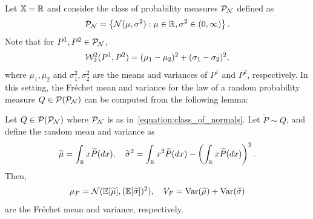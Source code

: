 Let $\mathbb{X} = \mathbb{R}$ and consider the class of probability measures $\mathcal{P}_{\mathcal{N}}$ defined as
\begin{equation}\label{equation:class_of_normals}
\mathcal{P}_{\mathcal{N}} = \left\{\mathcal{N}(\mu, \sigma^2) : \mu \in \mathbb{R}, \sigma^2 \in (0,\infty) \right\}.
\end{equation}
Note that for $P^1, P^2 \in \mathcal{P}_{\mathcal{N}}$,
\[
\mathcal{W}_2^2 (P^1, P^2) = (\mu_1 - \mu_2)^2 + (\sigma_1 - \sigma_2)^2,
\]
where $\mu_1, \mu_2$ and $\sigma_1^2, \sigma_2^2$ are the means and variances of $P^1$ and $P^2$, respectively. In this setting, the Fr\'{e}chet mean and variance for the law of a random probability measure $Q \in \mathcal{P}(\mathcal{P}_{\mathcal{N}})$ can be computed from the following lemma:

\begin{lemma}\label{lemma::frechet_mean_variance}
Let $Q \in \mathcal{P}(\mathcal{P}_{\mathcal{N}})$ where $\mathcal{P}_{\mathcal{N}}$ is as in~\eqref{equation:class_of_normals}. Let $\widetilde{P} \sim Q$, and define the random mean and variance as
\[
\widetilde{\mu} = \int_{\mathbb{R}} x \widetilde{P}(dx), \quad \widetilde{\sigma}^2 = \int_{\mathbb{R}} x^2 \widetilde{P}(dx) - \left(\int_{\mathbb{R}} x \widetilde{P}(dx)\right)^2.
\]
Then, 
\[
\mu_F = \mathcal{N}(\mathbb{E}[\widetilde{\mu}], (\mathbb{E} [\widetilde{\sigma}])^2), \quad  V_F = \mathrm{Var}(\widetilde{\mu}) + \mathrm{Var}(\widetilde{\sigma})
\]
are the Fr\'{e}chet mean and variance, respectively.
\end{lemma}
